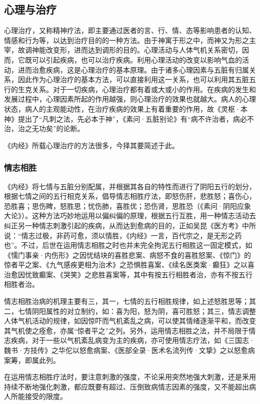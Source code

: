 \documentclass[12pt]{ctexbook}
\begin{document}
\subsection{心理与治疗}%

心理治疗，又称精神疗法，即主要通过医者的言、行、情、态等影响患者的认知、情感和行为等，以达到治疗目的的一种方法。由于神寓于形之中，而神又为形之主宰，故调神能改变形，进而达到调形的目的。心理活动与人体气机关系密切，因而，它既可以引起疾病，也可以治疗疾病。利用心理活动的改变以影响气血的活动，进而治愈疾病，这是心理治疗的基本原理。由于诸多心理因素与五脏有归属关系，因此作为心理治疗的基本方法，可以直接利用这一关系，也可以利用其五脏五行的生克关系。对于一切疾病，心理治疗都有着或大或小的作用。在疾病的发生和发展过程中，心理因素所起的作用越强，则心理治疗的效果也就越大。病人的心理状态，病人的主观能动性，在治疗疾病的效果上有着重要的作用，故《灵枢·本神》提出了“凡刺之法，先必本于神”，《素问·五脏别论》有“病不许治者，病必不治，治之无功矣”的论断。

《内经》所载心理治疗的方法很多，今择其要简述于此。

\subsubsection{情志相胜}%

《内经》将七情与五脏分别配属，并根据其各自的特性而进行了阴阳五行的划分，根据七情之间的五行相克关系，倡导情志相胜疗法，即怒伤肝，悲胜怒；喜伤心，恐胜喜；思伤睥，怒胜思；忧伤肺，喜胜优；恐伤肾，思胜恐（《素问·阴阳应象大论》）。这种方法巧妙地运用以偏纠偏的原理，根据五行互胜，用一种情志活动去纠正另一种情志刺激引起的疾病，从而达到愈病的目的，正如吴昆《医方考》中所说：“情志过极，非药可愈，须以情胜，《内经》一言，百代宗之，是无形之药也”。不过，后世在运用情志相胜之时也并未完全拘泥五行相胜这一固定模式，如《懦门事亲·内伤形》之因忧结块的喜胜悲案、病怒不食的喜胜怒案、《惊门》的惊者平之案、《九气感疾更相为治术》之恐惧胜喜案、《续名医类案·癫狂》之以喜治愈因忧致癫案、《哭笑》之悲胜喜案等，其中有按五行相胜者治，亦有不按五行相胜者治。

情志相胜治病的机理主要有三，其一，七情的五行相胜规律，如上述怒胜思等；其二，七情阴阳属性的对立制约，如：喜为阳，怒为阴，喜可胜怒；其三，情志调整人体气机活动的规律，如因惊吓而气机紊乱之病，可以使其情绪逐渐平和，而改变其气机使之痊愈，亦属“惊者平之”之列。另外，运用情志相胜之法，并不局限于情志疾病，对于一些以气机紊乱病变为主的疾病，亦可使用情志疗法，如《三国志·魏书·方技传》之华佗以怒愈病案、《医部全录·医术名流列传·文挚》之以怒愈病案筹，即属此列。

在运用情志相胜疗法时，要注意刺激的强度，不论采用突然地强大刺激，还是釆用持续不断地强化刺激，都应既要有超过、压倒致病情志因素的强度，又不能超出病人所能接受的限度。
\end{document}
